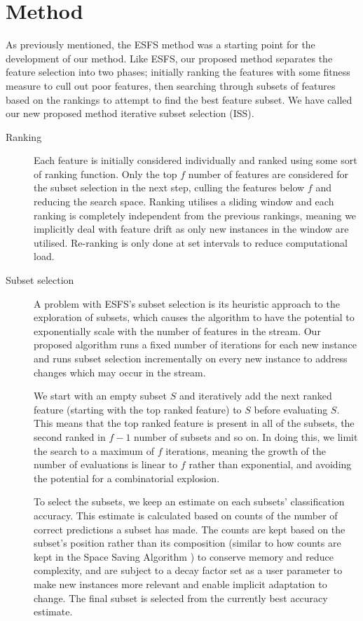 \chapter{Method}
\label{chapter:Method}

As previously mentioned, the ESFS method was a starting point for the development of our method. Like ESFS, our proposed method separates the feature selection into two phases; initially ranking the features with some fitness measure to cull out poor features, then searching through subsets of features based on the rankings to attempt to find the best feature subset. We have called our new proposed method iterative subset selection (ISS).

\begin{description}
\item[Ranking] Each feature is initially considered individually and ranked using some sort of ranking function. Only the top $f$ number of features are considered for the subset selection in the next step, culling the features below $f$ and reducing the search space. Ranking utilises a sliding window and each ranking is completely independent from the previous rankings, meaning we implicitly deal with feature drift as only new instances in the window are utilised. Re-ranking is only done at set intervals to reduce computational load.

\item[Subset selection] A problem with ESFS's subset selection is its heuristic approach to the exploration of subsets, which causes the algorithm to have the potential to exponentially scale with the number of features in the stream. Our proposed algorithm runs a fixed number of iterations for each new instance and runs subset selection incrementally on every new instance to address changes which may occur in the stream.

We start with an empty subset $S$ and iteratively add the next ranked feature (starting with the top ranked feature) to $S$ before evaluating $S$. This means that the top ranked feature is present in all of the subsets, the second ranked in $f-1$ number of subsets and so on. In doing this, we limit the search to a maximum of $f$ iterations, meaning the growth of the number of evaluations is linear to $f$ rather than exponential, and avoiding the potential for a combinatorial explosion. 

To select the subsets, we keep an estimate on each subsets' classification accuracy. This estimate is calculated based on counts of the number of correct predictions a subset has made. The counts are kept based on the subset's position rather than its composition (similar to how counts are kept in the Space Saving Algorithm \citep{Metwally2005}) to conserve memory and reduce complexity, and are subject to a decay factor set as a user parameter to make new instances more relevant and enable implicit adaptation to change. The final subset is selected from the currently best accuracy estimate.
\end{description}